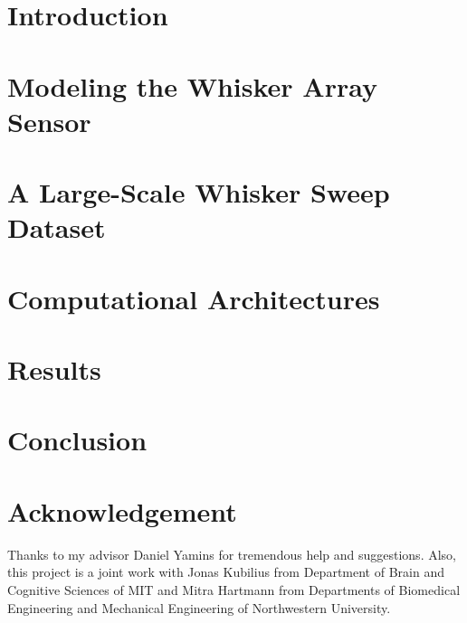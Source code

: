\documentclass{article}
\begin{document}
\section{Introduction} %
\vspace{-4mm}

\vspace{-3mm}
\section{Modeling the Whisker Array Sensor} %
\vspace{-4mm}

\vspace{-3mm}
\section{A Large-Scale Whisker Sweep Dataset} %
\vspace{-4mm}

\vspace{-3mm}
\section{Computational Architectures} %
\vspace{-4mm}

\vspace{-3mm}
\section{Results} %
\vspace{-4mm}

\vspace{-3mm}
\section{Conclusion}  %
\vspace{-4mm}

\section{Acknowledgement}
\vspace{-4mm}

Thanks to my advisor Daniel Yamins for tremendous help and suggestions. 
Also, this project is a joint work with Jonas Kubilius from Department of Brain and Cognitive Sciences of MIT and Mitra Hartmann from Departments of Biomedical Engineering and Mechanical Engineering of Northwestern University.

{\small
}

\end{document}
